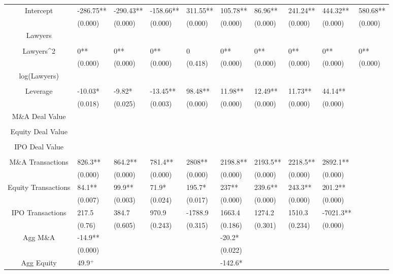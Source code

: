 \documentclass{article}
\begin{document}
\begin{table}[H]
\begin{tabular}{|clllllllll|}
Intercept & -286.75** & -290.43** & -158.66** & 311.55** & 105.78** & 86.96** & 241.24** & 444.32** & 580.68** \\
   & (0.000) & (0.000) & (0.000) & (0.000) & (0.000) & (0.000) & (0.000) & (0.000) & (0.000) \\
  Lawyers &  &  &  &  &  &  &  &  &  \\
   &  &  &  &  &  &  &  &  &  \\
  Lawyers^2 & 0** & 0** & 0** & 0 & 0** & 0** & 0** & 0** & 0** \\
   & (0.000) & (0.000) & (0.000) & (0.418) & (0.000) & (0.000) & (0.000) & (0.000) & (0.000) \\
  log(Lawyers) &  &  &  &  &  &  &  &  &  \\
   &  &  &  &  &  &  &  &  &  \\
  Leverage & -10.03* & -9.82* & -13.45** & 98.48** & 11.98** & 12.49** & 11.73** & 44.14** &  \\
   & (0.018) & (0.025) & (0.003) & (0.000) & (0.000) & (0.000) & (0.000) & (0.000) &  \\
  M\&A Deal Value &  &  &  &  &  &  &  &  &  \\
   &  &  &  &  &  &  &  &  &  \\
  Equity Deal Value &  &  &  &  &  &  &  &  &  \\
   &  &  &  &  &  &  &  &  &  \\
  IPO Deal Value &  &  &  &  &  &  &  &  &  \\
   &  &  &  &  &  &  &  &  &  \\
  M\&A Transactions & 826.3** & 864.2** & 781.4** & 2808** & 2198.8** & 2193.5** & 2218.5** & 2892.1** &  \\
   & (0.000) & (0.000) & (0.000) & (0.000) & (0.000) & (0.000) & (0.000) & (0.000) &  \\
  Equity Transactions & 84.1** & 99.9** & 71.9* & 195.7* & 237** & 239.6** & 243.3** & 201.2** &  \\
   & (0.007) & (0.003) & (0.024) & (0.017) & (0.000) & (0.000) & (0.000) & (0.000) &  \\
  IPO Transactions & 217.5 & 384.7 & 970.9 & -1788.9 & 1663.4 & 1274.2 & 1510.3 & -7021.3** &  \\
   & (0.76) & (0.605) & (0.243) & (0.315) & (0.186) & (0.301) & (0.234) & (0.000) &  \\
  Agg M\&A & -14.9** &  &  &  & -20.2* &  &  &  &  \\
   & (0.000) &  &  &  & (0.022) &  &  &  &  \\
  Agg Equity & 49.9$^{+}$ &  &  &  & -142.6* &  &  &  &  \\

\end{tabular}
\end{table}
\end{document}
